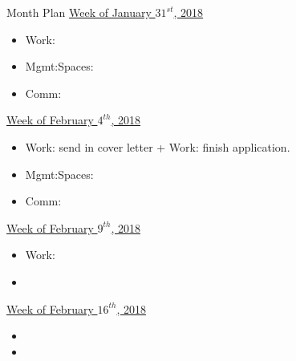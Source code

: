 \begin{columns}
\begin{column}{0.10\linewidth}
\begin{block}{Month Plan}
\underline{Week of January $31^{st}$, 2018}
\begin{itemize}
\tiny \item \tiny Work: 
\item \tiny Mgmt:Spaces: 
\item \tiny Comm: 
\end{itemize}

\underline{Week of February $4^{th}$, 2018}
\begin{itemize}
\tiny \item \tiny Work: send in cover letter + Work: finish application.  
\item \tiny Mgmt:Spaces: 
\item \tiny Comm: 
\end{itemize}


\underline{Week of February $9^{th}$, 2018}
\begin{itemize}
\tiny \item \tiny Work: 
\item \tiny
\end{itemize}

\underline{Week of February $16^{th}$, 2018}
\begin{itemize}
\tiny \item \tiny 
\item \tiny
\end{itemize}
\end{block}


\end{column}
\end{columns}
